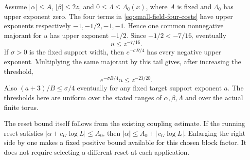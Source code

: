 Assume $|\alpha|\le A$, $|\beta|\le2z$, and
$0\le\Lambda\le\Lambda_0(x)$, where $A$ is fixed and $\Lambda_0$
has upper exponent zero. The four terms in
\eqref{eq:small-field-four-costs} have upper exponents respectively
$-1,-1/2,-1,-1$. Hence one common nonnegative majorant for $u$
has upper exponent $-1/2$. Since $-1/2<-7/16$, eventually
\begin{equation}\label{eq:small-field-action-price}
                              u\le z^{-7/16}.
\end{equation}
If $\sigma>0$ is the fixed support width, then
$e^{-\sigma B/4}$ has every negative upper exponent. Multiplying the
same majorant by this tail gives, after increasing the threshold,
\begin{equation}\label{eq:small-field-action-tail}
                  e^{-\sigma B/4}u\le z^{-23/20}.
\end{equation}
Also $(a+3)/B\le\sigma/4$ eventually for any fixed target support
exponent $a$. The thresholds here are uniform over the stated ranges
of $\alpha,\beta,\Lambda$ and over the actual finite torus.

The reset bound itself follows from the existing coupling estimate.
If the running reset satisfies
$|\alpha+c_G\log L|\le A_0$, then
$|\alpha|\le A_0+|c_G\log L|$. Enlarging the right side by one
makes a fixed positive bound available for this chosen block factor.
It does not require selecting a different reset at each application.

